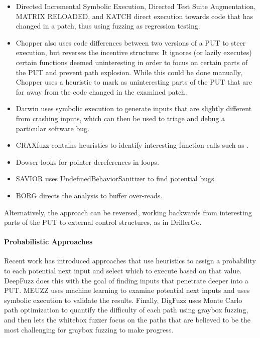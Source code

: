 \documentclass{article}
\begin{document}
\begin{multicols}{2}
    \begin{itemize}
        \item Directed Incremental Symbolic Execution\cite{DiSE}, Directed Test Suite Augmentation\cite{DTSA}, MATRIX RELOADED\cite{MATRIXRELOADED}, and KATCH\cite{KATCH} direct execution towards code that has changed in a patch, thus using fuzzing as regression testing.
        \item Chopper\cite{Chopped} also uses code differences between two versions of a PUT to steer execution, but reverses the incentive structure: It ignores (or lazily executes) certain functions deemed uninteresting in order to focus on certain parts of the PUT and prevent path explosion. While this could be done manually, Chopper\cite{Chopped} uses a heuristic to mark as uninteresting parts of the PUT that are far away from the code changed in the examined patch.
        \item Darwin\cite{Darwin} uses symbolic execution to generate inputs that are slightly different from crashing inputs, which can then be used to triage and debug a particular software bug.
        \item CRAXfuzz\cite{CRAXfuzz} contains heuristics to identify interesting function calls such as .
        \item Dowser\cite{Dowser} looks for pointer dereferences in loops.
        \item SAVIOR\cite{SAVIOR} uses UndefinedBehaviorSanitizer\cite{UndefinedBehaviorSanitizer} to find potential bugs.
        \item BORG\cite{BORG} directs the analysis to buffer over-reads.
    \end{itemize}

    Alternatively, the approach can be reversed, working backwards from interesting parts of the PUT to external control structures, as in DrillerGo\cite{DrillerGo}.

    \paragraph{Probabilistic Approaches}
    Recent work has introduced approaches that use heuristics to assign a probability to each potential next input and select which to execute based on that value. DeepFuzz\cite{DeepFuzz} does this with the goal of finding inputs that penetrate deeper into a PUT. MEUZZ\cite{MEUZZ} uses machine learning to examine potential next inputs and uses symbolic execution to validate the results. Finally, DigFuzz\cite{DigFuzz} uses Monte Carlo path optimization to quantify the difficulty of each path using graybox fuzzing, and then lets the whitebox fuzzer focus on the paths that are believed to be the most challenging for graybox fuzzing to make progress.


\end{multicols}
\end{document}
